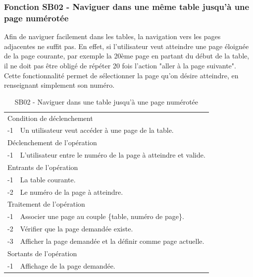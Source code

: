 \documentclass[a4paper]{article}
\begin{document}
\subsubsection{Fonction SB02 - Naviguer dans une m\^eme table jusqu'à une page numérotée}

Afin de naviguer facilement dans les tables, la navigation vers les pages adjacentes ne suffit pas. En effet, si l'utilisateur veut atteindre une page éloignée de la page courante, par exemple la 20ème page en partant du début de la table, il  ne doit pas être obligé de répéter 20 fois l'action "aller à la page suivante". Cette fonctionnalité permet de sélectionner la page qu'on désire atteindre, en renseignant simplement son numéro.
\begin{table}[H]
  \centering
   \small
	\begin{tabular}{|c|p{12cm}|}
   		\hline
   			\rowcolor{lightgray}\multicolumn{2}{|c|}{\textbf{SB02 - Naviguer dans une m\^eme table jusqu'à une page numérotée}} \\
   		\hline
   			\multicolumn{2}{|l|}{Condition de d\'eclenchement} \\
   		\hline
   		-1 & Un utilisateur veut acc\'eder \`a une page de la table. \\
   		\hline
   			\multicolumn{2}{|l|}{D\'eclenchement de l'op\'eration} \\
   		\hline
   			-1 & L'utilisateur entre le numéro de la page à atteindre et valide. \\
   		\hline
   			\multicolumn{2}{|l|}{Entrants de l'op\'eration} \\
   		\hline
   			-1 & La table courante. \\
        	-2 & Le numéro de la page à atteindre. \\ 
   		\hline
   			\multicolumn{2}{|l|}{Traitement de l'op\'eration} \\
  		\hline
   			-1 & Associer une page au couple \{table, numéro de page\}.  \\
        	-2 & V\'erifier que la page demand\'ee existe. \\
        	-3 & Afficher la page demand\'ee et la d\'efinir comme page actuelle. \\
   		\hline
   			\multicolumn{2}{|l|}{Sortants de l'op\'eration} \\
   		\hline
   			-1 & Affichage de la page demand\'ee. \\
   		\hline
	\end{tabular}
  \caption{SB02 - Naviguer dans une table jusqu'à une page numérotée}
  \normalsize
  \label{tab:naviguer_table_unique}
\end{table}
\end{document}
